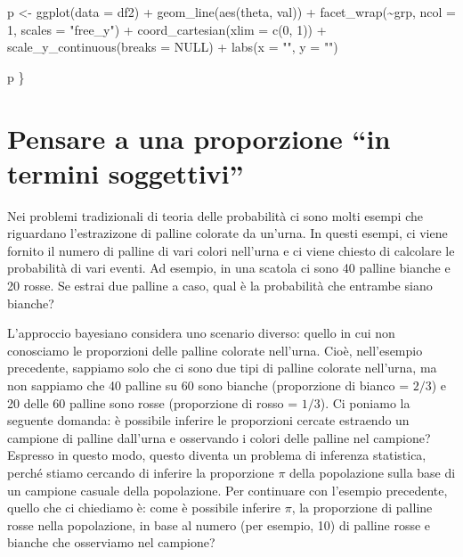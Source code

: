 \documentclass[
  11pt,
]{krantz}
\makeatletter
\newenvironment{Shaded}{\begin{snugshade}}{\end{snugshade}}
\newcommand{\AttributeTok}[1]{\textcolor[rgb]{0.61,0.61,0.61}{#1}}
\newcommand{\ConstantTok}[1]{\textcolor[rgb]{0,0,0}{#1}}
\newcommand{\DecValTok}[1]{\textcolor[rgb]{0.06,0.06,0.06}{#1}}
\newcommand{\FunctionTok}[1]{\textcolor[rgb]{0,0,0}{#1}}
\newcommand{\NormalTok}[1]{#1}
\newcommand{\OtherTok}[1]{\textcolor[rgb]{0.37,0.37,0.37}{#1}}
\newcommand{\SpecialCharTok}[1]{\textcolor[rgb]{0,0,0}{#1}}
\newcommand{\StringTok}[1]{\textcolor[rgb]{0.5,0.5,0.5}{#1}}
\newenvironment{kframe}{%
\medskip{}
\setlength{\fboxsep}{.8em}
 \def\at@end@of@kframe{}%
 \ifinner\ifhmode%
  \def\at@end@of@kframe{\end{minipage}}%
  \begin{minipage}{\columnwidth}%
 \fi\fi%
 \def\FrameCommand##1{\hskip\@totalleftmargin \hskip-\fboxsep
 \colorbox{shadecolor}{##1}\hskip-\fboxsep
     \hskip-\linewidth \hskip-\@totalleftmargin \hskip\columnwidth}%
 \MakeFramed {\advance\hsize-\width
   \@totalleftmargin\z@ \linewidth\hsize
   \@setminipage}}%
 {\par\unskip\endMakeFramed%
 \at@end@of@kframe}
\renewenvironment{Shaded}{\begin{kframe}}{\end{kframe}}
\theoremstyle{definition}
\theoremstyle{definition}
\theoremstyle{definition}
\theoremstyle{definition}
\theoremstyle{remark}
\makeatother
\begin{document}
\begin{Shaded}
\begin{Highlighting}[]
\NormalTok{  p }\OtherTok{\textless{}{-}} \FunctionTok{ggplot}\NormalTok{(}\AttributeTok{data =}\NormalTok{ df2) }\SpecialCharTok{+}
    \FunctionTok{geom\_line}\NormalTok{(}\FunctionTok{aes}\NormalTok{(theta, val)) }\SpecialCharTok{+}
    \FunctionTok{facet\_wrap}\NormalTok{(}\SpecialCharTok{\textasciitilde{}}\NormalTok{grp, }\AttributeTok{ncol =} \DecValTok{1}\NormalTok{, }\AttributeTok{scales =} \StringTok{"free\_y"}\NormalTok{) }\SpecialCharTok{+}
    \FunctionTok{coord\_cartesian}\NormalTok{(}\AttributeTok{xlim =} \FunctionTok{c}\NormalTok{(}\DecValTok{0}\NormalTok{, }\DecValTok{1}\NormalTok{)) }\SpecialCharTok{+}
    \FunctionTok{scale\_y\_continuous}\NormalTok{(}\AttributeTok{breaks =} \ConstantTok{NULL}\NormalTok{) }\SpecialCharTok{+}
    \FunctionTok{labs}\NormalTok{(}\AttributeTok{x =} \StringTok{""}\NormalTok{, }\AttributeTok{y =} \StringTok{""}\NormalTok{)}

\NormalTok{  p}
\NormalTok{\}}
\end{Highlighting}
\end{Shaded}

\hypertarget{pensare-a-una-proporzione-in-termini-soggettivi}{%
\chapter{Pensare a una proporzione ``in termini soggettivi''}\label{pensare-a-una-proporzione-in-termini-soggettivi}}

Nei problemi tradizionali di teoria delle probabilità ci sono molti esempi che riguardano l'estrazizone di palline colorate da un'urna. In questi esempi, ci viene fornito il numero di palline di vari colori nell'urna e ci viene chiesto di calcolare le probabilità di vari eventi. Ad esempio, in una scatola ci sono 40 palline bianche e 20 rosse. Se estrai due palline a caso, qual è la probabilità che entrambe siano bianche?

L'approccio bayesiano considera uno scenario diverso: quello in cui non conosciamo le proporzioni delle palline colorate nell'urna. Cioè, nell'esempio precedente, sappiamo solo che ci sono due tipi di palline colorate nell'urna, ma non sappiamo che 40 palline su 60 sono bianche (proporzione di bianco = \(2/3\)) e 20 delle 60 palline sono rosse (proporzione di rosso = \(1/3\)). Ci poniamo la seguente domanda: è possibile inferire le proporzioni cercate estraendo un campione di palline dall'urna e osservando i colori delle palline nel campione? Espresso in questo modo, questo diventa un problema di inferenza statistica, perché stiamo cercando di inferire la proporzione \(\pi\) della popolazione sulla base di un campione casuale della popolazione. Per continuare con l'esempio precedente, quello che ci chiediamo è: come è possibile inferire \(\pi\), la proporzione di palline rosse nella popolazione, in base al numero (per esempio, 10) di palline rosse e bianche che osserviamo nel campione?
\end{document}
